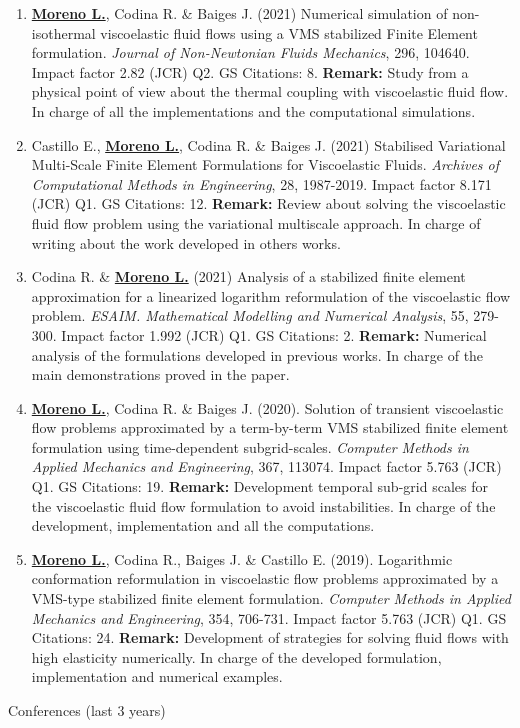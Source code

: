 \documentclass[letterpaper,english]{article}
\begin{document}
\begin{cv}{}
\begin{enumerate}{}
    \item \textbf{\underline{Moreno L.}}, Codina R. \& Baiges J. 
    (2021) 
    Numerical simulation of non-isothermal viscoelastic fluid flows using a VMS stabilized Finite Element formulation. 
    \textit{Journal of Non-Newtonian Fluids Mechanics}, 296, 104640. 
    Impact factor 2.82 (JCR) Q2.
    GS Citations: 8. 
    \textbf{Remark:} Study from a physical point of view about the thermal coupling with viscoelastic fluid flow. In charge of all the implementations and the computational simulations.
    
    \item Castillo E., \textbf{\underline{Moreno L.}}, Codina R. \& Baiges J. (2021) 
    Stabilised Variational Multi-Scale Finite Element Formulations for Viscoelastic Fluids. 
    \textit{Archives of Computational Methods in Engineering}, 28, 1987-2019. 
    Impact factor 8.171 (JCR) Q1.
    GS Citations: 12. 
    \textbf{Remark:} Review about solving the viscoelastic fluid flow problem using the variational multiscale approach. In charge of writing about the work developed in others works.
    \item Codina R. \& \textbf{\underline{Moreno L.}} (2021) 
    Analysis of a stabilized finite element approximation for a linearized logarithm reformulation of the viscoelastic flow problem. 
    \textit{ESAIM. Mathematical Modelling and Numerical Analysis}, 55, 279-300. 
    Impact factor 1.992 (JCR) Q1. 
    GS Citations: 2. 
    \textbf{Remark:} Numerical analysis of the formulations developed in previous works. In charge of the main demonstrations proved in the paper.
    \item \textbf{\underline{Moreno L.}}, Codina R. \& Baiges J. (2020). 
    Solution of transient viscoelastic flow problems approximated by a term-by-term VMS stabilized finite element formulation using time-dependent subgrid-scales. 
    \textit{Computer Methods in Applied Mechanics and Engineering}, 367, 113074. 
    Impact factor  5.763 (JCR) Q1. 
    GS Citations: 19. 
    \textbf{Remark:} Development temporal sub-grid scales for the viscoelastic fluid flow formulation to avoid instabilities. In charge of the development, implementation and all the computations.
    \item \textbf{\underline{Moreno L.}}, Codina R., Baiges J. \& Castillo E. (2019). 
    Logarithmic conformation reformulation in viscoelastic flow problems approximated by a VMS-type stabilized finite element formulation. 
    \textit{Computer Methods in Applied Mechanics and Engineering}, 354, 706-731. 
    Impact factor  5.763 (JCR) Q1. 
    GS Citations: 24. 
    \textbf{Remark:} Development of strategies for solving fluid flows with high elasticity numerically. In charge of the developed formulation, implementation and numerical examples.
\end{enumerate}
\setlength{\cvlabelwidth}{1.7cm}
\begin{cvlist}{Conferences (last 3 years)}


\end{cvlist}
\end{cv}
\end{document}
